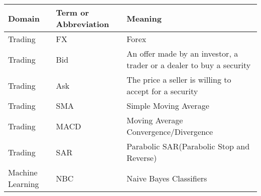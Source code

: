 \documentclass[10pt]{IEEEtran}
\begin{document}
\begin{tabular}{l | l | l}
Domain & Term or Abbreviation &  Meaning  \\
\hline
Trading & FX & Forex \\ 
Trading & Bid & An offer made by an investor, a trader or a dealer to buy a security\\
Trading & Ask & The price a seller is willing to accept for a security\\
Trading & SMA & Simple Moving Average\\
Trading & MACD & Moving Average Convergence/Divergence\\
Trading & SAR & Parabolic SAR(Parabolic Stop and Reverse)\\
Machine Learning & NBC & Naive Bayes Classifiers\\
\end{tabular}
\end{document}
